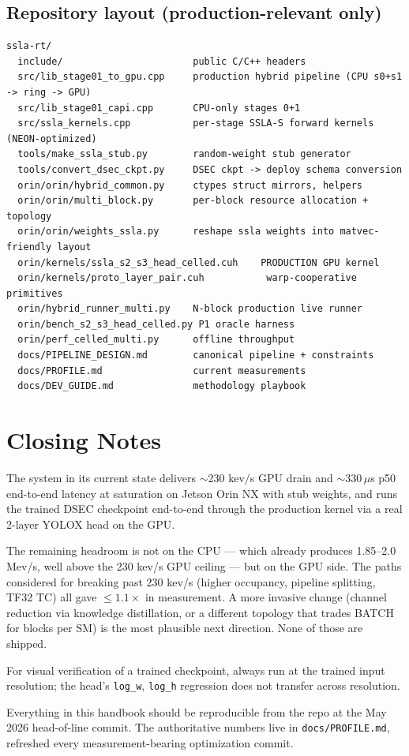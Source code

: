 \documentclass[11pt,a4paper]{article}
\begin{document}
\subsection{Repository layout (production-relevant only)}

\begin{lstlisting}
ssla-rt/
  include/                       public C/C++ headers
  src/lib_stage01_to_gpu.cpp     production hybrid pipeline (CPU s0+s1 -> ring -> GPU)
  src/lib_stage01_capi.cpp       CPU-only stages 0+1
  src/ssla_kernels.cpp           per-stage SSLA-S forward kernels (NEON-optimized)
  tools/make_ssla_stub.py        random-weight stub generator
  tools/convert_dsec_ckpt.py     DSEC ckpt -> deploy schema conversion
  orin/orin/hybrid_common.py     ctypes struct mirrors, helpers
  orin/orin/multi_block.py       per-block resource allocation + topology
  orin/orin/weights_ssla.py      reshape ssla weights into matvec-friendly layout
  orin/kernels/ssla_s2_s3_head_celled.cuh    PRODUCTION GPU kernel
  orin/kernels/proto_layer_pair.cuh           warp-cooperative primitives
  orin/hybrid_runner_multi.py    N-block production live runner
  orin/bench_s2_s3_head_celled.py P1 oracle harness
  orin/perf_celled_multi.py      offline throughput
  docs/PIPELINE_DESIGN.md        canonical pipeline + constraints
  docs/PROFILE.md                current measurements
  docs/DEV_GUIDE.md              methodology playbook
\end{lstlisting}

\section{Closing Notes}

The system in its current state delivers $\sim$230 kev/s GPU drain and
$\sim$330\,\(\mu\)s p50 end-to-end latency at saturation on Jetson Orin
NX with stub weights, and runs the trained DSEC checkpoint end-to-end
through the production kernel via a real 2-layer YOLOX head on the GPU.

The remaining headroom is not on the CPU --- which already produces
1.85--2.0 Mev/s, well above the 230 kev/s GPU ceiling --- but on the
GPU side. The paths considered for breaking past 230 kev/s
(higher occupancy, pipeline splitting, TF32 TC) all gave $\leq 1.1\times$ in
measurement. A more invasive change (channel reduction via knowledge
distillation, or a different topology that trades BATCH for blocks per
SM) is the most plausible next direction. None of those are shipped.

For visual verification of a trained checkpoint, always run at the
trained input resolution; the head's \texttt{log\_w}, \texttt{log\_h}
regression does not transfer across resolution.

Everything in this handbook should be reproducible from the repo at
the May 2026 head-of-line commit. The authoritative numbers live in
\texttt{docs/PROFILE.md}, refreshed every measurement-bearing
optimization commit.
\end{document}
